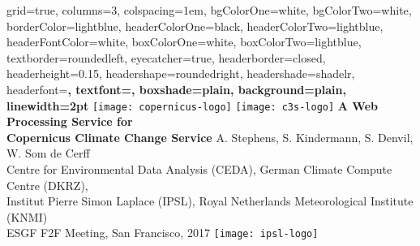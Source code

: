 \documentclass[portrait,a0paper]{baposter}
\begin{document}


\begin{poster}%
  {
  grid=true,
  columns=3,
  colspacing=1em,
  bgColorOne=white,
  bgColorTwo=white,
  borderColor=lightblue,
  headerColorOne=black,
  headerColorTwo=lightblue,
  headerFontColor=white,
  boxColorOne=white,
  boxColorTwo=lightblue,
  textborder=roundedleft,
  eyecatcher=true,
  headerborder=closed,
  headerheight=0.15\textheight,
  headershape=roundedright,
  headershade=shadelr,
  headerfont=\Large\bf\textsc, %
  textfont={\setlength{\parindent}{1.5em}},
  boxshade=plain,
  background=plain,
  linewidth=2pt
  }
  {
    \texttt{[image: copernicus-logo]}
    \texttt{[image: c3s-logo]}
  }
  {\sf\bf
          A Web Processing Service for\\ Copernicus Climate Change Service
  }
  {
    \vspace{1em} A. Stephens, S. Kindermann, S. Denvil, W. Som de Cerff\\
    {\smaller Centre for Environmental Data Analysis (CEDA),
    German Climate Compute Centre (DKRZ),\\
    Institut Pierre Simon Laplace (IPSL),
    Royal Netherlands Meteorological Institute (KNMI)\\[1em]
    ESGF F2F Meeting, San Francisco, 2017}
  }
  {
    \texttt{[image: ipsl-logo]}
  }



\end{poster}
\end{document}
